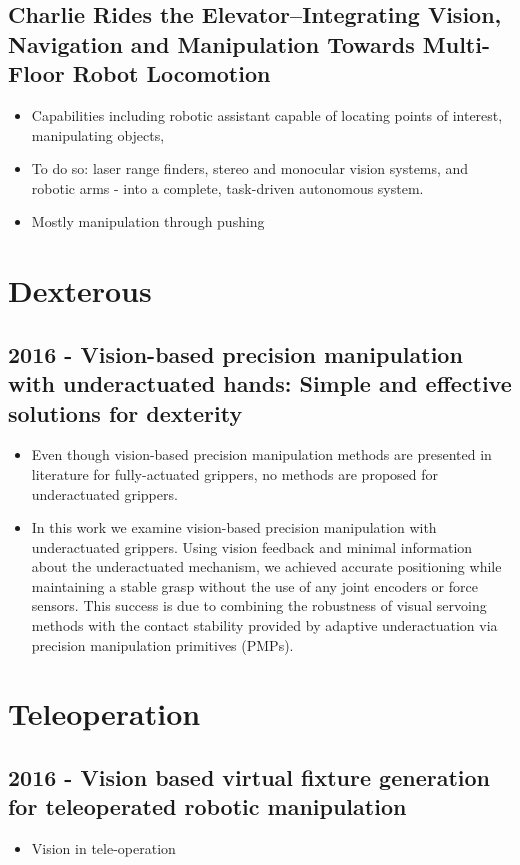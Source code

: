 \subsection{Charlie Rides the Elevator–Integrating Vision, Navigation and Manipulation Towards Multi-Floor Robot Locomotion}
\begin{itemize}
\item Capabilities including  robotic assistant capable of locating points of interest, manipulating objects,
\item To do so: laser range finders, stereo and monocular vision systems, and robotic arms - into a complete, task-driven autonomous system.
\item Mostly manipulation through pushing
\end{itemize}


\section{Dexterous}
\subsection{2016 - Vision-based precision manipulation with underactuated hands: Simple and effective solutions for dexterity}
\begin{itemize}
\item Even though vision-based precision manipulation methods are presented in literature for fully-actuated grippers, no methods are proposed for underactuated grippers.
\item In this work we examine vision-based precision manipulation with underactuated grippers. Using vision feedback and minimal information about the underactuated mechanism, we achieved accurate positioning while maintaining a stable grasp without the use of any joint encoders or force sensors. This success is due to combining the robustness of visual servoing methods with the contact stability provided by adaptive underactuation via precision manipulation primitives (PMPs).
\end{itemize}

\section{Teleoperation}
\subsection{2016 - Vision based virtual fixture generation for teleoperated robotic manipulation}
\begin{itemize}
\item Vision in tele-operation 
\end{itemize}

